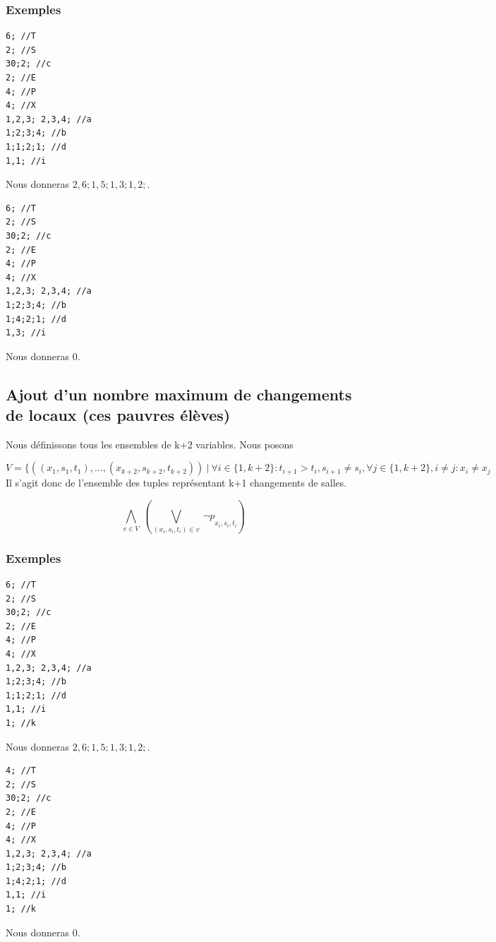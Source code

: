 \documentclass[a4paper,10pt]{article}
\begin{document}
\subsubsection{Exemples}
\begin{lstlisting}[frame=single]
6; //T
2; //S
30;2; //c
2; //E
4; //P
4; //X
1,2,3; 2,3,4; //a
1;2;3;4; //b
1;1;2;1; //d
1,1; //i
\end{lstlisting}
Nous donneras $2,6;1,5;1,3;1,2;$.
\begin{lstlisting}[frame=single]
6; //T
2; //S
30;2; //c
2; //E
4; //P
4; //X
1,2,3; 2,3,4; //a
1;2;3;4; //b
1;4;2;1; //d
1,3; //i
\end{lstlisting}
Nous donneras $0$.
\subsection{Ajout d'un nombre maximum de changements de locaux (ces pauvres élèves)}

Nous définissons tous les ensembles de k+2 variables.
Nous posons 

\begin{equation}
V = \{((x_1,s_1,t_1), ..., (x_{k+2},s_{k+2},t_{k+2}))\ |\ \forall i \in \{1,k+2\} : t_{i+1} > t_i, s_{i+1} \neq s_i, \forall j \in \{1,k+2\}, i \neq j : x_i \neq x_j
\end{equation}
Il s'agit donc de l'ensemble des tuples représentant k+1 changements de salles.

\begin{equation}
\bigwedge\limits_{v \in V}\ (\bigvee\limits_{(x_i,s_i,t_i) \in v}\  \neg p\underset{x_i,s_i,t_i}{})
\end{equation}

\subsubsection{Exemples}
\begin{lstlisting}[frame=single]
6; //T
2; //S
30;2; //c
2; //E
4; //P
4; //X
1,2,3; 2,3,4; //a
1;2;3;4; //b
1;1;2;1; //d
1,1; //i
1; //k
\end{lstlisting}
Nous donneras $2,6;1,5;1,3;1,2;$.
\begin{lstlisting}[frame=single]
4; //T
2; //S
30;2; //c
2; //E
4; //P
4; //X
1,2,3; 2,3,4; //a
1;2;3;4; //b
1;4;2;1; //d
1,1; //i
1; //k
\end{lstlisting}
Nous donneras $0$.
\end{document}

